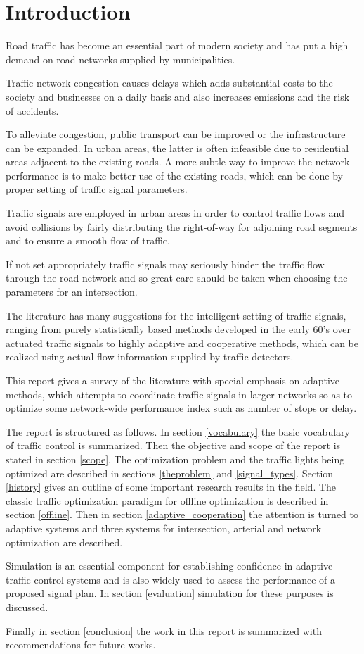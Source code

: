 \section{Introduction}
Road traffic has become an essential part of modern society and has put a high demand on road networks supplied by municipalities. 

Traffic network congestion causes delays which adds substantial costs to the society and businesses on a daily basis and also increases emissions and the risk of accidents.

To alleviate congestion, public transport can be improved or the infrastructure can be expanded. In urban areas, the latter is often infeasible due to residential areas adjacent to the existing roads. 
A more subtle way to improve the network performance is to make better use of the existing roads, which can be done by proper setting of traffic signal parameters. 

Traffic signals are employed in urban areas in order to control traffic flows and avoid collisions by fairly distributing the right-of-way for adjoining road segments and to ensure a smooth flow of traffic.

If not set appropriately traffic signals may seriously hinder the traffic flow through the road network and so great care should be taken when choosing the parameters for an intersection. 

The literature has many suggestions for the intelligent setting of traffic signals, ranging from purely statistically based methods developed in the early 60's over actuated traffic signals to highly adaptive and cooperative methods, which can be realized using actual flow information supplied by traffic detectors. 

This report gives a survey of the literature with special emphasis on adaptive methods, which attempts to coordinate traffic signals in larger networks so as to optimize some network-wide performance index such as number of stops or delay. 

The report is structured as follows. In section \ref{vocabulary} the basic vocabulary of traffic control is summarized. Then the objective and scope of the report is stated in section \ref{scope}. 
The optimization problem and the traffic lights being optimized are described in sections \ref{theproblem} and \ref{signal_types}.
Section \ref{history} gives an outline of some important research results in the field. 
The classic traffic optimization paradigm for offline optimization is described in section \ref{offline}.
Then in section \ref{adaptive_cooperation} the attention is turned to adaptive systems and three systems for intersection, arterial and network optimization are described. 

Simulation is an essential component for establishing confidence in adaptive traffic control systems and is also widely used to assess the performance of a proposed signal plan. In  section \ref{evaluation} simulation for these purposes is discussed.

Finally in section \ref{conclusion} the work in this report is summarized with recommendations for future works.
